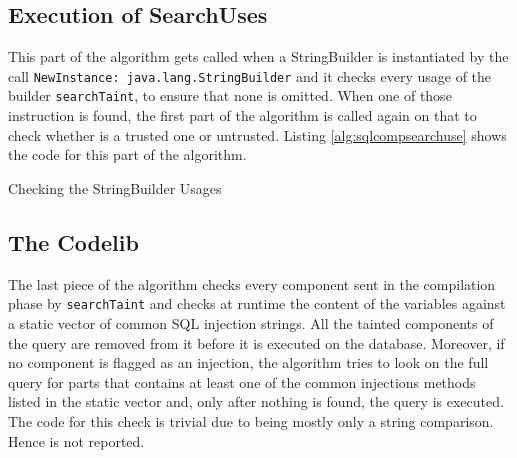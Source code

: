 \subsection{Execution of SearchUses}
This part of the algorithm gets called when a StringBuilder is instantiated by the call \texttt{NewInstance: java.lang.StringBuilder} and it checks every usage of the builder \texttt{searchTaint}, to ensure that none is omitted. When one of those instruction is found, the first part of the algorithm is called again on that to check whether is a trusted one or untrusted. Listing \ref{alg:sqlcompsearchuse} shows the code for this part of the algorithm.

\begin{algorithm}
\caption{Checking the StringBuilder Usages}
\label{alg:sqlcompsearchuse}
\end{algorithm}

\subsection{The Codelib}
The last piece of the algorithm checks every component sent in the compilation phase by \texttt{searchTaint} and checks at runtime the content of the variables against a static vector of common SQL injection strings. All the tainted components of the query are removed from it before it is executed on the database. Moreover, if no component is flagged as an injection, the algorithm tries to look on the full query for parts that contains at least one of the common injections methods listed in the static vector and, only after nothing is found, the query is executed. The code for this check is trivial due to being mostly only a string comparison. Hence is not reported.

